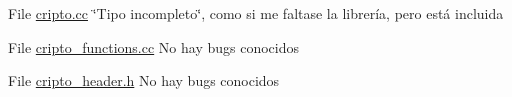 
\begin{DoxyRefList}
\item[File \mbox{\hyperlink{cripto_8cc}{cripto.cc}} ]\label{bug__bug000001}%
%
\char`\"{}\+Tipo incompleto\char`\"{}, como si me faltase la librería, pero está incluida  
\item[File \mbox{\hyperlink{cripto__functions_8cc}{cripto\+\_\+functions.cc}} ]\label{bug__bug000002}%
%
No hay bugs conocidos  
\item[File \mbox{\hyperlink{cripto__header_8h}{cripto\+\_\+header.h}} ]\label{bug__bug000003}%
%
No hay bugs conocidos 
\end{DoxyRefList}